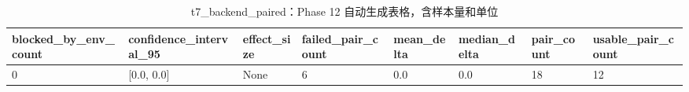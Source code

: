 \begin{table}[htbp]
\centering
\caption{t7_backend_paired：Phase 12 自动生成表格，含样本量和单位}
\begin{tabular}{llllllll}
\hline
blocked_by_env_count & confidence_interval_95 & effect_size & failed_pair_count & mean_delta & median_delta & pair_count & usable_pair_count \\
\hline
0 & [0.0, 0.0] & None & 6 & 0.0 & 0.0 & 18 & 12 \\
\hline
\end{tabular}
\end{table}
